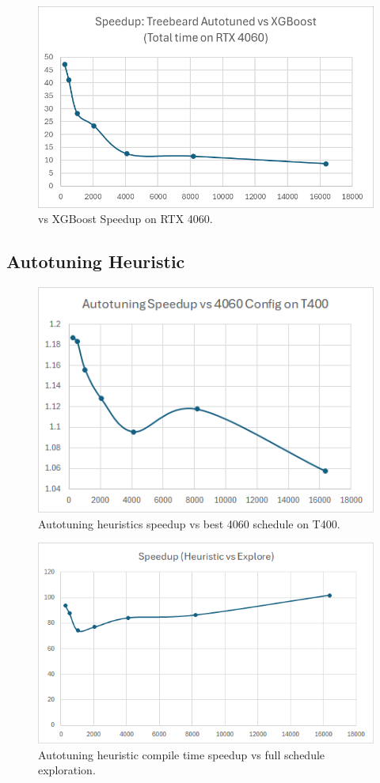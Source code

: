 \begin{figure}[htb]
  \centering
  \includegraphics[width=0.75\linewidth]{figures/TBvsXGB_TotalTime.png}
  \caption{\Treebeard{} vs XGBoost Speedup on RTX 4060.}
  \label{Fig:TBvsXGBoost_Speedup}
\end{figure}

\subsection{Autotuning Heuristic}
\begin{figure}[htb]
  \centering
  \includegraphics[width=0.75\linewidth]{figures/AutotuningSpeedupvs4060Sched_T400.png}
  \caption{Autotuning heuristics speedup vs best 4060 schedule on T400.}
  \label{Fig:AutotuningSpeedupvs4060Sched_T400}
\end{figure}

\begin{figure}[htb]
  \centering
  \includegraphics[width=0.75\linewidth]{figures/HeuristicVsFullExplore_Speedup.png}
  \caption{Autotuning heuristic compile time speedup vs full schedule exploration.}
  \label{Fig:HeuristicVsFullExplore_Speedup}
\end{figure}

